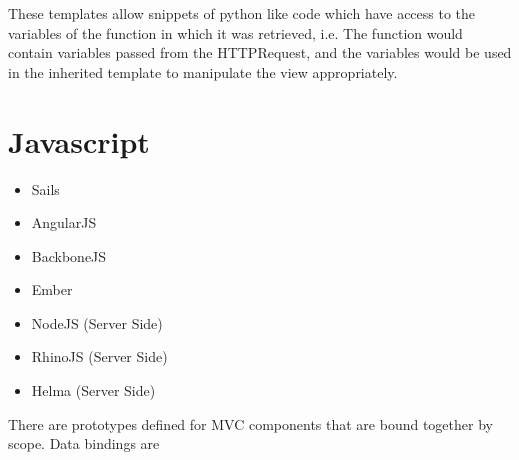 These templates allow snippets of python like code which have access to the variables of the function in which it was retrieved, i.e.
The function would contain variables passed from the HTTPRequest, and the variables would be used in the inherited template to manipulate
the view appropriately.

\section{Javascript}

\begin{itemize}
  \item Sails
  \item AngularJS
  \item BackboneJS
  \item Ember
  \item NodeJS (Server Side)
  \item RhinoJS  (Server Side)
  \item Helma (Server Side)
\end{itemize}

There are prototypes defined for MVC components that are bound together by scope. Data bindings are
